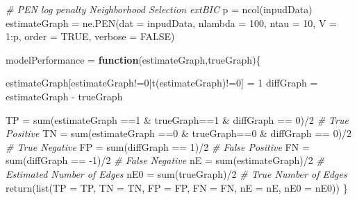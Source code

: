 \documentclass[
]{book}
\newenvironment{Shaded}{\begin{snugshade}}{\end{snugshade}}
\newcommand{\AttributeTok}[1]{\textcolor[rgb]{0.77,0.63,0.00}{#1}}
\newcommand{\CommentTok}[1]{\textcolor[rgb]{0.56,0.35,0.01}{\textit{#1}}}
\newcommand{\ConstantTok}[1]{\textcolor[rgb]{0.00,0.00,0.00}{#1}}
\newcommand{\ControlFlowTok}[1]{\textcolor[rgb]{0.13,0.29,0.53}{\textbf{#1}}}
\newcommand{\DecValTok}[1]{\textcolor[rgb]{0.00,0.00,0.81}{#1}}
\newcommand{\FunctionTok}[1]{\textcolor[rgb]{0.00,0.00,0.00}{#1}}
\newcommand{\NormalTok}[1]{#1}
\newcommand{\OtherTok}[1]{\textcolor[rgb]{0.56,0.35,0.01}{#1}}
\newcommand{\SpecialCharTok}[1]{\textcolor[rgb]{0.00,0.00,0.00}{#1}}
\begin{document}
\begin{Shaded}
\begin{Highlighting}[]
\CommentTok{\# PEN log penalty Neighborhood Selection extBIC}
\NormalTok{p }\OtherTok{=} \FunctionTok{ncol}\NormalTok{(inpudData)}
\NormalTok{estimateGraph  }\OtherTok{=} \FunctionTok{ne.PEN}\NormalTok{(}\AttributeTok{dat =}\NormalTok{ inpudData, }\AttributeTok{nlambda =} \DecValTok{100}\NormalTok{, }\AttributeTok{ntau =} \DecValTok{10}\NormalTok{, }\AttributeTok{V =} \DecValTok{1}\SpecialCharTok{:}\NormalTok{p, }\AttributeTok{order =} \ConstantTok{TRUE}\NormalTok{, }\AttributeTok{verbose =} \ConstantTok{FALSE}\NormalTok{)}
\end{Highlighting}
\end{Shaded}

\begin{Shaded}
\begin{Highlighting}[]
\NormalTok{modelPerformance }\OtherTok{=} \ControlFlowTok{function}\NormalTok{(estimateGraph,trueGraph)\{}
  
\NormalTok{  estimateGraph[estimateGraph}\SpecialCharTok{!=}\DecValTok{0}\SpecialCharTok{|}\FunctionTok{t}\NormalTok{(estimateGraph)}\SpecialCharTok{!=}\DecValTok{0}\NormalTok{] }\OtherTok{=} \DecValTok{1}
\NormalTok{  diffGraph }\OtherTok{=}\NormalTok{ estimateGraph }\SpecialCharTok{{-}}\NormalTok{ trueGraph}
  
\NormalTok{  TP }\OtherTok{=} \FunctionTok{sum}\NormalTok{(estimateGraph }\SpecialCharTok{==}\DecValTok{1} \SpecialCharTok{\&}\NormalTok{ trueGraph}\SpecialCharTok{==}\DecValTok{1} \SpecialCharTok{\&}\NormalTok{ diffGraph }\SpecialCharTok{==} \DecValTok{0}\NormalTok{)}\SpecialCharTok{/}\DecValTok{2} \CommentTok{\# True Positive}
\NormalTok{  TN }\OtherTok{=} \FunctionTok{sum}\NormalTok{(estimateGraph }\SpecialCharTok{==}\DecValTok{0} \SpecialCharTok{\&}\NormalTok{ trueGraph}\SpecialCharTok{==}\DecValTok{0} \SpecialCharTok{\&}\NormalTok{ diffGraph }\SpecialCharTok{==} \DecValTok{0}\NormalTok{)}\SpecialCharTok{/}\DecValTok{2} \CommentTok{\# True Negative}
\NormalTok{  FP }\OtherTok{=} \FunctionTok{sum}\NormalTok{(diffGraph }\SpecialCharTok{==} \DecValTok{1}\NormalTok{)}\SpecialCharTok{/}\DecValTok{2}    \CommentTok{\# False Positive}
\NormalTok{  FN }\OtherTok{=} \FunctionTok{sum}\NormalTok{(diffGraph }\SpecialCharTok{==} \SpecialCharTok{{-}}\DecValTok{1}\NormalTok{)}\SpecialCharTok{/}\DecValTok{2}   \CommentTok{\# False Negative}
\NormalTok{  nE }\OtherTok{=} \FunctionTok{sum}\NormalTok{(estimateGraph)}\SpecialCharTok{/}\DecValTok{2}     \CommentTok{\# Estimated Number of Edges}
\NormalTok{  nE0 }\OtherTok{=} \FunctionTok{sum}\NormalTok{(trueGraph)}\SpecialCharTok{/}\DecValTok{2}        \CommentTok{\# True Number of Edges}
  \FunctionTok{return}\NormalTok{(}\FunctionTok{list}\NormalTok{(}\AttributeTok{TP =}\NormalTok{ TP, }\AttributeTok{TN =}\NormalTok{ TN, }\AttributeTok{FP =}\NormalTok{ FP, }\AttributeTok{FN =}\NormalTok{ FN, }\AttributeTok{nE =}\NormalTok{ nE, }\AttributeTok{nE0 =}\NormalTok{ nE0))}
\NormalTok{\}}
\end{Highlighting}
\end{Shaded}
\end{document}
